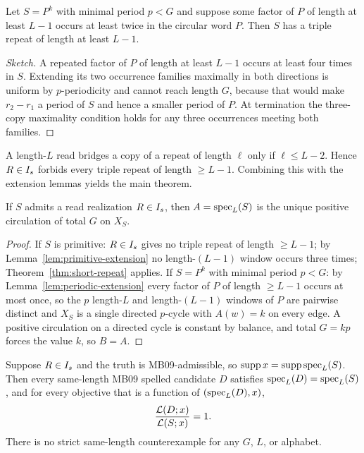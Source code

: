 \begin{lemma}
\label{lem:periodic-extension}
Let $S=P^k$ with minimal period $p<G$ and suppose some factor of $P$ of length at
least $L-1$ occurs at least twice in the circular word $P$. Then $S$ has a triple
repeat of length at least $L-1$.
\end{lemma}

\begin{proof}[Sketch]
A repeated factor of $P$ of length at least $L-1$ occurs at least four times in
$S$. Extending its two occurrence families maximally in both directions is
uniform by $p$-periodicity and cannot reach length $G$, because that would make
$r_2-r_1$ a period of $S$ and hence a smaller period of $P$. At termination the
three-copy maximality condition holds for any three occurrences meeting both
families.
\end{proof}

A length-$L$ read bridges a copy of a repeat of length $\ell$ only if
$\ell\le L-2$. Hence $R\in I_s$ forbids every triple repeat of length
$\ge L-1$. Combining this with the extension lemmas yields the main theorem.

\begin{theorem}
\label{thm:rigidity}
If $S$ admits a read realization $R\in I_s$, then $A=\operatorname{spec}_L(S)$ is the unique
positive circulation of total $G$ on $X_S$.
\end{theorem}

\begin{proof}
If $S$ is primitive: $R\in I_s$ gives no triple repeat of length $\ge L-1$; by
Lemma~\ref{lem:primitive-extension} no length-$(L-1)$ window occurs three times;
Theorem~\ref{thm:short-repeat} applies. If $S=P^k$ with minimal period
$p<G$: by Lemma~\ref{lem:periodic-extension} every factor of $P$ of length
$\ge L-1$ occurs at most once, so the $p$ length-$L$ and length-$(L-1)$ windows
of $P$ are pairwise distinct and $X_S$ is a single directed $p$-cycle with
$A(w)=k$ on every edge. A positive circulation on a directed cycle is constant
by balance, and total $G=kp$ forces the value $k$, so $B=A$.
\end{proof}

\begin{corollary}
\label{cor:same-length-zero}
Suppose $R\in I_s$ and the truth is MB09-admissible, so
$\operatorname{supp} x=\operatorname{supp}\operatorname{spec}_L(S)$. Then every same-length MB09 spelled candidate
$D$ satisfies $\operatorname{spec}_L(D)=\operatorname{spec}_L(S)$, and for every objective that is a function
of $(\operatorname{spec}_L(D),x)$,
\[
  \frac{\mathcal{L}(D;x)}{\mathcal{L}(S;x)}=1 .
\]
There is no strict same-length counterexample for any $G$, $L$, or alphabet.
\end{corollary}

